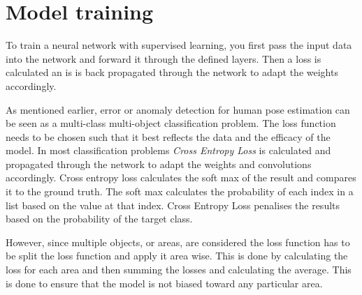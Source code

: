\section{Model training}
\label{sec:model_training}

To train a neural network with supervised learning, you first pass the input data into the network and forward it through the defined layers. Then a loss is calculated an is is back propagated through the network to adapt the weights accordingly. 

As mentioned earlier, error or anomaly detection for human pose estimation can be seen as a multi-class multi-object classification problem. The loss function needs to be chosen such that it best reflects the data and the efficacy of the model. In most classification problems \textit{Cross Entropy Loss} is calculated and propagated through the network to adapt the weights and convolutions accordingly. Cross entropy loss calculates the soft max of the result and compares it to the ground truth. The soft max calculates the probability of each index in a list based on the value at that index. Cross Entropy Loss penalises the results based on the probability of the target class.

However, since multiple objects, or areas, are considered the loss function has to be split the loss function and apply it area wise. This is done by calculating the loss for each area and then summing the losses and calculating the average. This is done to ensure that the model is not biased toward any particular area. 
